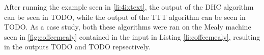 After running the example seen in \ref{li:4ixtext}, the output of the DHC algorithm can be seen in TODO, while the output of the TTT algorithm can be seen in TODO. As a case study, both these algorithms were ran on the Mealy machine seen in \ref{fig:coffeemealy} contained in the input in Listing \ref{li:coffeemealy}, resulting in the outputs TODO and TODO repsectively.